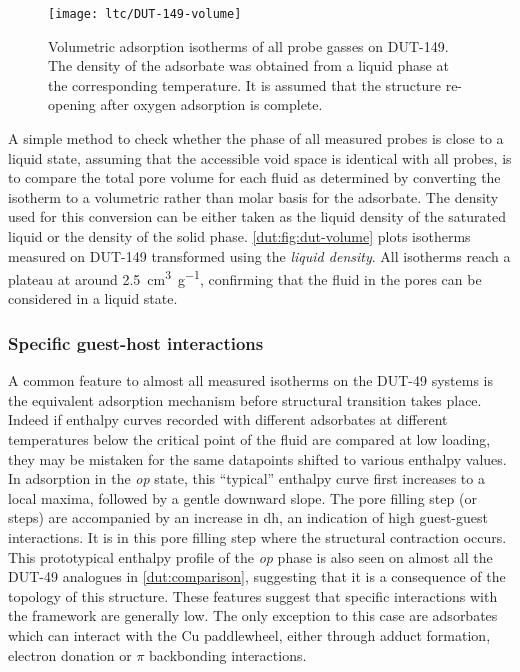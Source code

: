 \begin{figure}[htb]
    \centering
    \texttt{[image: ltc/DUT-149-volume]}%
    \caption{Volumetric adsorption isotherms of all probe gasses
    on DUT-149. The density of the adsorbate was obtained from
    a liquid phase at the corresponding temperature.
    It is assumed that the structure re-opening after oxygen
    adsorption is complete.}%
    \label{dut:fig:dut-volume}
\end{figure}

A simple method to check whether the phase of all measured probes
is close to a liquid state, assuming that the accessible void space 
is identical with all probes, is to compare the total pore volume 
for each fluid as determined by converting the isotherm to a volumetric
rather than molar basis for the adsorbate. The density used for 
this conversion can be either taken as the liquid density of the
saturated liquid or the density of the solid phase.
\autoref{dut:fig:dut-volume} plots isotherms measured on DUT-149
transformed using the \textit{liquid density}. All isotherms reach a plateau
at around \SI{2.5}{\centi\metre^3\per\gram}, confirming that the fluid in 
the pores can be considered in a liquid state.

\subsubsection{Specific guest-host interactions}

A common feature to almost all measured isotherms on the DUT-49 systems
is the equivalent adsorption mechanism before structural transition 
takes place.
Indeed if enthalpy curves recorded with different adsorbates at different
temperatures below the critical point of the fluid are compared at low 
loading, they may be mistaken for the same datapoints shifted to
various enthalpy values.
In adsorption in the \textit{op} state, this ``typical'' enthalpy 
curve first increases to a local maxima, followed
by a gentle downward slope. The pore filling step (or steps)
are accompanied by an increase in \gls{dh},
an indication of high guest-guest interactions. It is in this 
pore filling step where the structural contraction occurs. 
This prototypical enthalpy profile of the \textit{op} phase 
is also seen on almost all the DUT-49 analogues
in \autoref{dut:comparison}, suggesting that it is a consequence of 
the topology of this structure.
These features suggest that specific interactions with the framework
are generally low. The only 
exception to this case are adsorbates which can interact with the 
Cu paddlewheel, either through adduct formation, 
electron donation or \(\pi\) backbonding interactions. 

